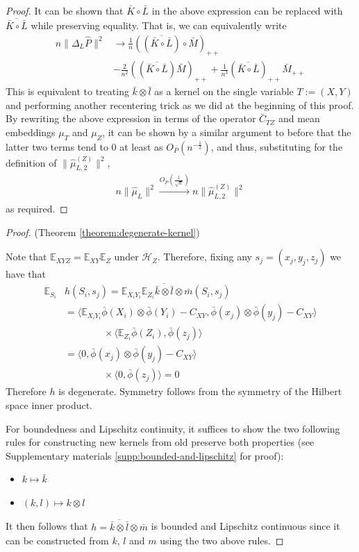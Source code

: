 \documentclass[]{article}
\begin{document}
\begin{proof}
It can be shown that $\bar{K}\circ \bar{L}$ in the above expression can be replaced with $\overline{\bar{K}\circ \bar{L}}$ while preserving equality. That is, we can equivalently write
\begin{align*}
n\|\Delta_L \hat{P}\|^2 & \longrightarrow \frac{1}{n}((\overline{\bar{K}\circ \bar{L}}) \circ \bar{M})_{++}\\& - \frac{2}{n^2}((\overline{\bar{K}\circ \bar{L}})\bar{M})_{++} + \frac{1}{n^3}(\overline{\bar{K}\circ \bar{L}})_{++}\bar{M}_{++}
\end{align*}
This is equivalent to treating $\bar{k}\otimes\bar{l}$ as a kernel on the single variable $T:=(X,Y)$ and performing another recentering trick as we did at the beginning of this proof. By rewriting the above expression in terms of the operator $\bar{C}_{TZ}$ and mean embeddings $\mu_T$ and $\mu_Z$, it can be shown by a similar argument to before that the latter two terms tend to 0 at least as $O_P(n^{-\frac{1}{2}})$, and thus, substituting for the definition of $\|\hat \mu^{(Z)}_{L,2} \|^2$,
\begin{align*}
 n \|\hat \mu_{L} \|^2 \xrightarrow{O_P(\frac{1}{\sqrt{n}})} n \|\hat \mu^{(Z)}_{L,2} \|^2
\end{align*} as required.
\end{proof}

\begin{proof}(Theorem \ref{theorem:degenerate-kernel})

Note that $\mathbb{E}_{XYZ} = \mathbb{E}_{XY}\mathbb{E}_Z$ under $\mathcal{H}_Z$. Therefore, fixing any $s_j = (x_j,y_j,z_j)$ we have that
\begin{align*}
\mathbb{E}_{S_i}&h(S_i,s_j) = \mathbb{E}_{X_iY_i} \mathbb{E}_{Z_i}\overline{\bar{k}\otimes\bar{l}}\otimes\bar{m} (S_i,s_j) \\
 &=  \langle\mathbb{E}_{X_iY_i}\bar{\phi}(X_i)\otimes\bar{\phi}(Y_i) - C_{XY},\bar{\phi}(x_j)\otimes\bar{\phi}(y_j) - C_{XY}\rangle \\
 &\quad \quad \quad \quad \times \langle \mathbb{E}_{Z_i}\bar{\phi}(Z_i),\bar{\phi}(z_j)\rangle \\
 &=  \langle 0 ,\bar{\phi}(x_j)\otimes\bar{\phi}(y_j) - C_{XY}\rangle \\
 &\quad \quad \quad \quad \times \langle 0 ,\bar{\phi}(z_j)\rangle  = 0
\end{align*}
Therefore $h$ is degenerate. Symmetry follows from the symmetry of the Hilbert space inner product.

For boundedness and Lipschitz continuity, it suffices to show the two following rules for constructing new kernels from old preserve both properties (see Supplementary materials \ref{supp:bounded-and-lipschitz} for proof):
\begin{itemize} \setlength\itemsep{0em}
\item $k \mapsto \bar{k}$ 
\item $(k,l) \mapsto k \otimes l$
\end{itemize}
It then follows that $h = \overline{\bar{k}\otimes\bar{l}}\otimes\bar{m}$ is bounded and Lipschitz continuous since it can be constructed from $k$, $l$ and $m$ using the two above rules.
\end{proof}
\end{document}
